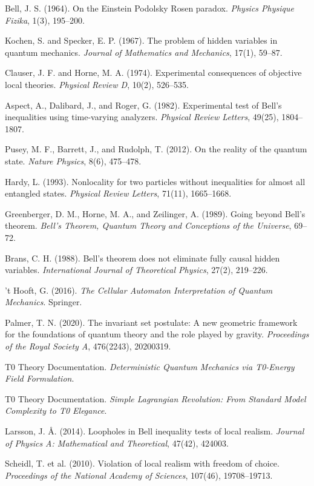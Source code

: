 \documentclass[12pt,a4paper]{article}
\begin{document}
	\begin{thebibliography}{99}
		Bell, J. S. (1964). On the Einstein Podolsky Rosen paradox. \textit{Physics Physique Fizika}, 1(3), 195--200.
		
		Kochen, S. and Specker, E. P. (1967). The problem of hidden variables in quantum mechanics. \textit{Journal of Mathematics and Mechanics}, 17(1), 59--87.
		
		Clauser, J. F. and Horne, M. A. (1974). Experimental consequences of objective local theories. \textit{Physical Review D}, 10(2), 526--535.
		
		Aspect, A., Dalibard, J., and Roger, G. (1982). Experimental test of Bell's inequalities using time-varying analyzers. \textit{Physical Review Letters}, 49(25), 1804--1807.
		
		Pusey, M. F., Barrett, J., and Rudolph, T. (2012). On the reality of the quantum state. \textit{Nature Physics}, 8(6), 475--478.
		
		Hardy, L. (1993). Nonlocality for two particles without inequalities for almost all entangled states. \textit{Physical Review Letters}, 71(11), 1665--1668.
		
		Greenberger, D. M., Horne, M. A., and Zeilinger, A. (1989). Going beyond Bell's theorem. \textit{Bell's Theorem, Quantum Theory and Conceptions of the Universe}, 69--72.
		
		Brans, C. H. (1988). Bell's theorem does not eliminate fully causal hidden variables. \textit{International Journal of Theoretical Physics}, 27(2), 219--226.
		
		't Hooft, G. (2016). \textit{The Cellular Automaton Interpretation of Quantum Mechanics}. Springer.
		
		Palmer, T. N. (2020). The invariant set postulate: A new geometric framework for the foundations of quantum theory and the role played by gravity. \textit{Proceedings of the Royal Society A}, 476(2243), 20200319.
		
		T0 Theory Documentation. \textit{Deterministic Quantum Mechanics via T0-Energy Field Formulation}.
		
		T0 Theory Documentation. \textit{Simple Lagrangian Revolution: From Standard Model Complexity to T0 Elegance}.
		
		Larsson, J. Å. (2014). Loopholes in Bell inequality tests of local realism. \textit{Journal of Physics A: Mathematical and Theoretical}, 47(42), 424003.
		
		Scheidl, T. et al. (2010). Violation of local realism with freedom of choice. \textit{Proceedings of the National Academy of Sciences}, 107(46), 19708--19713.
	\end{thebibliography}
	
\end{document}
